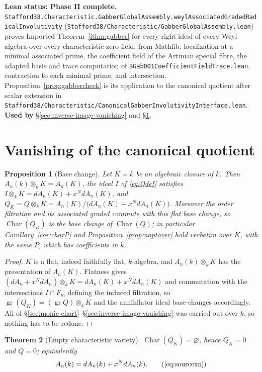 \documentclass[11pt]{article}
\theoremstyle{plain}
\newtheorem{theorem}{Theorem}[section]
\newtheorem{proposition}[theorem]{Proposition}
\theoremstyle{definition}
\theoremstyle{remark}
\theoremstyle{plain}
\newcommand{\Char}{\operatorname{Char}}
\newcommand{\gr}{\operatorname{gr}}
\newcommand{\Kbar}{\overline{k}}
\newcommand{\backtomap}{%
  \hfill\raisebox{0.15ex}{\footnotesize\hyperref[fig:map]{$\uparrow$\,proof map}}}
\newcommand{\nodehead}[2]{%
  \section{#2}\label{sec:#1}%
  \nopagebreak\noindent{\footnotesize\ttfamily\color{csoft}#1}\backtomap\par
  \nopagebreak\vspace{0.6ex}}
\begin{document}
\begin{provbox}
\textbf{Lean status: Phase II complete.}
\texttt{Stafford38.\allowbreak Characteristic.\allowbreak GabberGlobalAssembly.\allowbreak weylAssociatedGradedRadicalInvolutivity}
(\texttt{Stafford38/Characteristic/GabberGlobalAssembly.lean}) proves
Imported Theorem~\ref{ithm:gabber} for every right ideal of every Weyl
algebra over every characteristic-zero field, from Mathlib: localization at
a minimal associated prime, the coefficient field of the Artinian special
fibre, the adapted basis and trace computation of
\texttt{BGab001CoefficientFieldTrace.lean}, contraction to each minimal
prime, and intersection. Proposition~\ref{prop:gabbercheck} is its
application to the canonical quotient after scalar extension in
\texttt{Stafford38/Characteristic/CanonicalGabberInvolutivityInterface.lean}.
\textbf{Used by} \S\ref{sec:inverse-image-vanishing} and \S\ref{sec:quotient-vanishing}.
\end{provbox}

\nodehead{quotient-vanishing}{Vanishing of the canonical quotient}

\begin{proposition}[Base change]\label{prop:basechange}
Let $K=\Kbar$ be an algebraic closure of $k$. Then
$A_n(k)\otimes_kK=A_n(K)$, the ideal $I$ of \eqref{eq:Qdef} satisfies
$I\otimes_kK=dA_n(K)+x^NdA_n(K)$, and
$Q_K=Q\otimes_kK=A_n(K)/\bigl(dA_n(K)+x^NdA_n(K)\bigr)$.
Moreover the order filtration and its associated graded commute with this flat
base change, so $\Char(Q_K)$ is the base change of $\Char(Q)$; in particular
Corollary~\ref{cor:charP} and Proposition~\ref{prop:noptover} hold verbatim
over $K$, with the same $P$, which has coefficients in $k$.
\end{proposition}

\begin{proof}
$K$ is a flat, indeed faithfully flat, $k$-algebra, and $A_n(k)\otimes_kK$ has
the presentation of $A_n(K)$. Flatness gives
$(dA_n+x^NdA_n)\otimes_kK=dA_n(K)+x^NdA_n(K)$ and commutation with the
intersections $I\cap F_m$ defining the induced filtration, so
$\gr(Q_K)=(\gr Q)\otimes_kK$ and the annihilator ideal base-changes
accordingly. All of \S\ref{sec:monic-chart}--\S\ref{sec:inverse-image-vanishing}
was carried out over $k$, so nothing has to be redone.
\end{proof}

\begin{theorem}[Empty characteristic variety]\label{thm:vanish}
$\Char(Q_K)=\varnothing$, hence $Q_K=0$ and $Q=0$; equivalently
\[
  A_n(k)=dA_n(k)+x^NdA_n(k) . \tag{\ref{eq:sourcexn}}
\]
\end{theorem}
\end{document}

